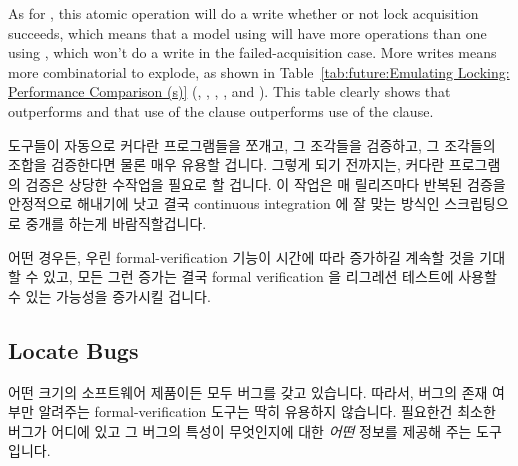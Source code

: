 {	As for , this atomic operation will do a
	write whether or not lock acquisition succeeds, which means
	that a model using  will have more operations
	than one using , which won't do a write
	in the failed-acquisition case.
	More writes means more combinatorial to explode, as shown in
	Table~\ref{tab:future:Emulating Locking: Performance Comparison (s)}
	(,
	,
	,
	, and
	).
	This table clearly shows that 
	outperforms  and that use of the
	 clause outperforms use of the  clause.
	\fi
} \QuickQuizEnd

도구들이 자동으로 커다란 프로그램들을 쪼개고, 그 조각들을 검증하고, 그 조각들의
조합을 검증한다면 물론 매우 유용할 겁니다.
그렇게 되기 전까지는, 커다란 프로그램의 검증은 상당한 수작업을 필요로 할
겁니다.
이 작업은 매 릴리즈마다 반복된 검증을 안정적으로 해내기에 낫고 결국 continuous
integration 에 잘 맞는 방식인 스크립팅으로 중개를 하는게 바람직할겁니다.

어떤 경우든, 우린 formal-verification 기능이 시간에 따라 증가하길 계속할 것을
기대할 수 있고, 모든 그런 증가는 결국 formal verification 을 리그레션 테스트에
사용할 수 있는 가능성을 증가시킬 겁니다.
\iffalse

It would of course be quite useful for tools to automatically divide
up large programs, verify the pieces, and then verify the combinations
of pieces.
In the meantime, verification of large programs will require significant
manual intervention.
This intervention will preferably mediated by scripting, the better to
reliably carry out repeated verifications on each release, and
preferably eventually in a manner well-suited for continuous integration.

In any case, we can expect formal-verification capabilities to continue
to increase over time, and any such increases will in turn increase
the applicability of formal verification to regression testing.
\fi

\subsection{Locate Bugs}
\label{sec:future:Locate Bugs}

어떤 크기의 소프트웨어 제품이든 모두 버그를 갖고 있습니다.
따라서, 버그의 존재 여부만 알려주는 formal-verification 도구는 딱히 유용하지
않습니다.
필요한건 최소한 버그가 어디에 있고 그 버그의 특성이 무엇인지에 대한 \emph{어떤}
정보를 제공해 주는 도구입니다.

